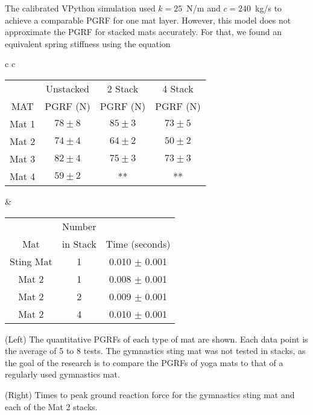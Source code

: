 \documentclass[12pt,aps,prb,preprint]{revtex4-1}   %
\begin{document}
The calibrated VPython simulation used $k=25$~N/m and $c=240$~kg/s to achieve a comparable PGRF for one mat layer. However, this model does not approximate the PGRF for stacked mats accurately. For that, we found an equivalent spring stiffness using the equation

\begin{tabular}{c c}
	\hspace{-2 mm}
	\begin{tabular}{ c | c  c  c}
	&Unstacked&2 Stack&4 Stack\\
	MAT&PGRF (N)&PGRF (N)&PGRF (N)\\
	\hline
	Mat 1 & $78 \pm 8$ & $85 \pm 3$ & $73 \pm 5$ \\
	Mat 2 & $74 \pm 4$ & $64 \pm 2$ & $50 \pm 2$ \\
	Mat 3 & $82 \pm 4$ & $75 \pm 3$ & $73 \pm 3$ \\
	Mat 4 & $59 \pm 2$ & ** & ** \\
	\end{tabular}
&
	\hspace{2 mm}
	\begin{tabular}{ c | c | c}
	 &Number&\\
	Mat&in Stack&Time (seconds)\\
	\hline
	Sting Mat&1&0.010  $\pm$ 0.001\\
	Mat 2&1&0.008 $\pm$ 0.001\\
	Mat 2&2&0.009 $\pm$ 0.001\\
	Mat 2&4&0.010 $\pm$ 0.001
	\end{tabular}

\end{tabular}
\begin{table}[h]
	\caption{(Left) The quantitative PGRFs of each type of mat are shown. Each data point is the average of 5 to 8 tests. The gymnastics sting mat was not tested in stacks, as the goal of the research is to compare the PGRFs of yoga mats to that of a regularly used gymnastics mat.}
	\label{tab:allPGRF}
\end{table}
\vspace{-8 mm}
\begin{table}[h]
	\caption{(Right) Times to peak ground reaction force for the gymnastics sting mat and each of the Mat 2 stacks.}
	\label{tab:times}
\end{table}
\end{document}
